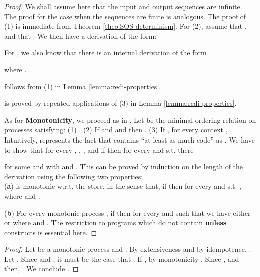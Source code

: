 \documentclass{tlp}
\begin{document}
\begin{proof}
We shall assume here that the input and output sequences are infinite. The proof for the case when the sequences are finite is analogous. 
The proof of (1) is immediate from Theorem \ref{theo:SOS-determinism}.  For (2), assume that ,  and that . We then have a derivation of the form:

For , we also know that there is an internal derivation of the form

 where  .  

  follows from  (1) in 
Lemma \ref{lemma:redi-properties}. 

  is proved by repeated applications of (3) in Lemma \ref{lemma:redi-properties}.
 
As for  {\bf Monotonicity}, we proceed as in  \cite{NPV02}. Let  be the minimal ordering relation on  processes satisfying: (1)  . (2) If  and  and  then 
	. (3) If , for every context , .
	Intuitively,   represents the fact that  contains ``at least as much code'' as . We have to show that for every , , ,   and  if 
  then for every  and  s.t.  there 

for some   and  with  and  .
 This can be proved by induction on the  length of the derivation using the following two properties:\\
\noindent ({\bf a}) 
 is monotonic w.r.t. the store, in the sense that,  if  then for every  and  s.t. 
, 
 where 
and .


\noindent ({\bf b}) For every monotonic process , if  then for every  and   
	such that  we have either 
  or 
  where 
  and  .
The restriction to  programs which do not contain {\bf unless}  constructs is essential  here. \end{proof}




\begin{proof}
Let  be a monotonic process and 
.
	By extensiveness  and by 
	idempotence,   . 
	Let . Since  and , it must be the case that 
	. If , by monotonicity . Since ,  and then, . We conclude . 
\end{proof}
\end{document}
